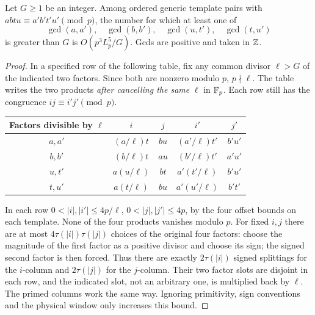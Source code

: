 \begin{lemma}\label{lem:gcd}
Let $G\ge1$ be an integer. Among ordered generic template pairs with
$abtu\equiv a'b't'u'\pmod p$, the number for which at least one of
\[
 \gcd(a,a'),\quad\gcd(b,b'),\quad\gcd(u,t'),\quad\gcd(t,u')
\]
is greater than $G$ is $O(p^3 L_p^5/G)$. Gcds are positive and taken in $\mathbb Z$.
\end{lemma}
\begin{proof}
In a specified row of the following table, fix any common divisor $\ell>G$ of the indicated two factors. Since both are nonzero modulo $p$, $p\nmid\ell$. The table writes the two products \emph{after cancelling the same} $\ell$ in $\mathbb F_p$. Each row still has the congruence $ij\equiv i'j'\pmod p$.
\begin{center}\small
\begin{tabular}{@{}ccccc@{}}\toprule
Factors divisible by $\ell$ & $i$ & $j$ & $i'$ & $j'$ \\ \midrule
$a,a'$ & $(a/\ell)t$ & $bu$ & $(a'/\ell)t'$ & $b'u'$\\
$b,b'$ & $(b/\ell)t$ & $au$ & $(b'/\ell)t'$ & $a'u'$\\
$u,t'$ & $a(u/\ell)$ & $bt$ & $a'(t'/\ell)$ & $b'u'$\\
$t,u'$ & $a(t/\ell)$ & $bu$ & $a'(u'/\ell)$ & $b't'$\\ \bottomrule
\end{tabular}\end{center}
In each row $0<|i|,|i'|\le 4p/\ell$, $0<|j|,|j'|\le4p$, by the four offset bounds on each template. None of the four products vanishes modulo $p$. For fixed $i,j$ there are at most $4\tau(|i|)\tau(|j|)$ choices of the original four factors: choose the magnitude of the first factor as a positive divisor and choose its sign; the signed second factor is then forced. Thus there are exactly $2\tau(|i|)$ signed splittings for the $i$-column and $2\tau(|j|)$ for the $j$-column. Their two factor slots are disjoint in each row, and the indicated slot, not an arbitrary one, is multiplied back by $\ell$. The primed columns work the same way. Ignoring primitivity, sign conventions and the physical window only increases this bound.


\end{proof}
